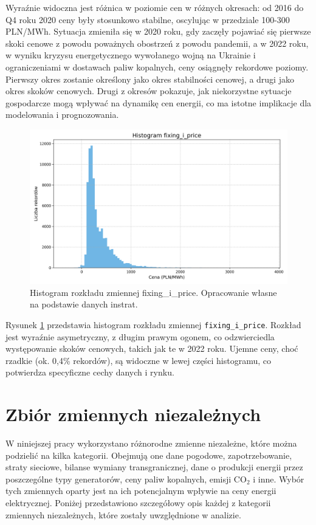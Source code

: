 Wyraźnie widoczna jest różnica w poziomie cen w różnych okresach: od 2016 do Q4 roku 2020 ceny były stosunkowo stabilne, oscylując w przedziale 100-300 PLN/MWh. Sytuacja zmieniła się w 2020 roku, gdy zaczęły pojawiać się pierwsze skoki cenowe z powodu poważnych obostrzeń z powodu pandemii, a w 2022 roku, w wyniku kryzysu energetycznego wywołanego wojną na Ukrainie i ograniczeniami w dostawach paliw kopalnych, ceny osiągnęły rekordowe poziomy. Pierwszy okres zostanie określony jako okres stabilności cenowej, a drugi jako okres skoków cenowych. Drugi z okresów pokazuje, jak niekorzystne sytuacje gospodarcze mogą wpływać na dynamikę cen energii, co ma istotne implikacje dla modelowania i prognozowania.

\begin{figure}
    \centering
    \includegraphics[width=\textwidth]{../plots/fixing_i_price_histogram.png}
    \caption{Histogram rozkładu zmiennej fixing\_i\_price. Opracowanie własne na podstawie danych instrat.}
    \label{fig:fixing-i-price-histogram}
\end{figure}

Rysunek \ref{fig:fixing-i-price-histogram} przedstawia histogram rozkładu zmiennej \texttt{fixing\_i\_price}. Rozkład jest wyraźnie asymetryczny, z długim prawym ogonem, co odzwierciedla występowanie skoków cenowych, takich jak te w 2022 roku. Ujemne ceny, choć rzadkie (ok. 0,4\% rekordów), są widoczne w lewej części histogramu, co potwierdza specyficzne cechy danych i rynku.

\section{Zbiór zmiennych niezależnych}
W niniejszej pracy wykorzystano różnorodne zmienne niezależne, które można podzielić na kilka kategorii. Obejmują one dane pogodowe, zapotrzebowanie, straty sieciowe, bilanse wymiany transgranicznej, dane o produkcji energii przez poszczególne typy generatorów, ceny paliw kopalnych, emisji CO$_2$ i inne. Wybór tych zmiennych oparty jest na ich potencjalnym wpływie na ceny energii elektrycznej. Poniżej przedstawiono szczegółowy opis każdej z kategorii zmiennych niezależnych, które zostały uwzględnione w analizie.

